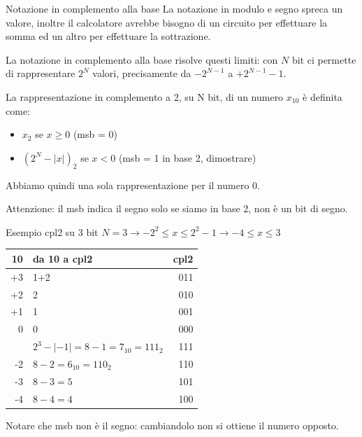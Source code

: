 \documentclass[aspectratio=169, ]{beamer}
\begin{document}
\begin{frame}{Notazione in complemento alla base}
La notazione in modulo e segno spreca un valore, inoltre il calcolatore avrebbe bisogno di un circuito per effettuare la somma ed un altro per effettuare la sottrazione.

La \alert{notazione in complemento alla base} risolve questi limiti: con $N$ bit ci permette di rappresentare $2^N$ valori, precisamente da $-2^{N-1}$ a $+2^{N-1}-1$.

\pause

La rappresentazione in complemento a 2, su N bit, di un numero $x_{10}$ è definita come:
\begin{itemize}
	\item $x_2$ se $x \geq 0$ (msb = 0)
	\item $(2^N-|x|)_2$ se $x < 0$ (msb = 1 in base 2, dimostrare)
\end{itemize}

\pause

Abbiamo quindi una sola rappresentazione per il numero 0.

Attenzione: il msb indica il segno solo se siamo in base 2, \alert{non è un bit di segno}.
\end{frame}



\begin{frame}{Esempio cpl2 su 3 bit}
$N=3 \rightarrow -2^2 \leq x \leq 2^2-1 \rightarrow -4 \leq x \leq 3$
\pause

\begin{tabular}{r|l|r}
	10	&	da 10 a cpl2	&	cpl2 \\
	\hline
	+3&	1+2	&	011\\
	+2& 2	&	010\\
	+1& 1	&	001\\
	0 & 0	&	000\\
	\pause
	-1&	$2^3-|-1| = 8-1 = 7_{10} = 111_2$& 111	\\
	-2&	$8-2 = 6_{10} = 110_2$& 110	\\
	-3&	$8-3 = 5$& 101	\\
	-4&	$8-4 = 4$& 100\\
\end{tabular}

Notare che msb \alert{non è il segno}: cambiandolo non si ottiene il numero opposto.
\end{frame}
\end{document}
